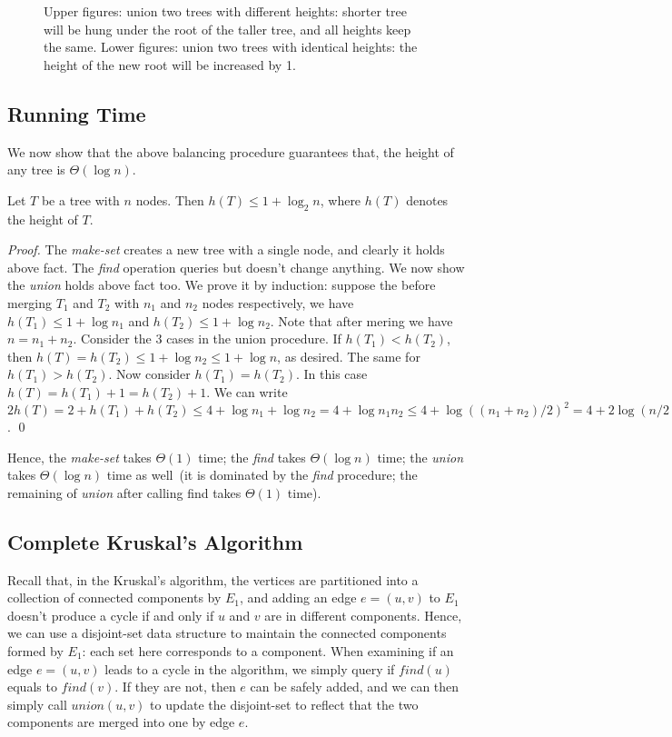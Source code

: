 \begin{figure}[h]
\centering{}
\vspace*{0.4cm}
\centering{}
\caption{Upper figures: union two trees with different heights: shorter tree will
be hung under the root of the taller tree, and all heights keep the same.
Lower figures: union two trees with identical heights: the height of 
	the new root will be increased by 1.}
\label{fig:union}
\end{figure}

\subsection*{Running Time}

We now show that the above balancing procedure guarantees
that, the height of any tree is $\Theta(\log n)$. 
\begin{fact}
Let $T$ be a tree with $n$ nodes. Then $h(T) \le 1 + \log_2 n$, where $h(T)$ denotes the height of $T$.
\end{fact}
\emph{Proof.} The \emph{make-set} creates a new tree with a single node, and clearly it holds above fact.
The \emph{find} operation queries but doesn't change anything. We now show the \emph{union}
holds above fact too. We prove it by induction: suppose the before merging $T_1$ and $T_2$
with $n_1$ and $n_2$ nodes respectively, we have $h(T_1) \le 1 + \log n_1$ and $h(T_2) \le 1 + \log n_2$.
Note that after mering we have $n = n_1 + n_2$.
Consider the 3 cases in the union procedure. 
If $h(T_1) < h(T_2)$, then $h(T) = h(T_2) \le 1 + \log n_2 \le 1 + \log n$, as desired.
The same for $h(T_1) > h(T_2)$. Now consider $h(T_1) = h(T_2)$.
In this case $h(T) = h(T_1) + 1 = h(T_2) + 1$.
We can write $2h(T) = 2 + h(T_1) + h(T_2) \le 4 + \log n_1 + \log n_2 = 4 + \log n_1n_2 \le 4 + \log((n_1+n_2)/2)^2 = 4 + 2\log (n/2) = 2(1+\log n)$.  \qed

Hence, the \emph{make-set} takes $\Theta(1)$ time;
the \emph{find} takes $\Theta(\log n)$ time;
the \emph{union} takes $\Theta(\log n)$ time as well~(it is dominated by the \emph{find} procedure; the remaining of \emph{union}
after calling find takes $\Theta(1)$ time).

\subsection*{Complete Kruskal's Algorithm}

Recall that, in the Kruskal's algorithm, the vertices are partitioned
into a collection of connected components by $E_1$,
and adding an edge $e = (u,v)$ to $E_1$ doesn't produce a cycle
if and only if $u$ and $v$ are in different components.
Hence, we can use a disjoint-set data structure
to maintain the connected components formed by $E_1$: 
each set here corresponds to a component.
When examining if an edge $e=(u,v)$ leads to a cycle in the algorithm,
we simply query if $find(u)$ equals to $find(v)$.
If they are not, then $e$ can be safely added,
and we can then simply call $union(u,v)$ to update the
disjoint-set to reflect that the two components are merged into one
by edge $e$.

